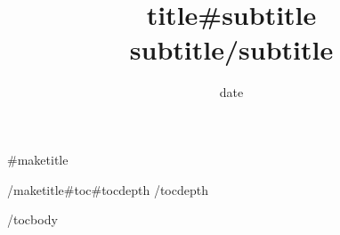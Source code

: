 \documentclass{{{latex_class_options:raw}}}{{{{latex_class:raw}}}}
{{{packages}}}{{{latex_header}}}{{{font_fallbacks}}}{{{#secnumdepth}}}\setcounter{secnumdepth}{{{{secnumdepth}}}}
\date{{{{date}}}}
\title{{{{title}}}{{{#subtitle}}}\\
\medskip
\large {{{subtitle}}}{{{/subtitle}}}}
\begin{document}
{{{#maketitle}}}\maketitle
{{{/maketitle}}}{{{#toc}}}{{{#tocdepth}}}
{{{/tocdepth}}}\tableofcontents

{{{/toc}}}{{{body}}}
\end{document}
